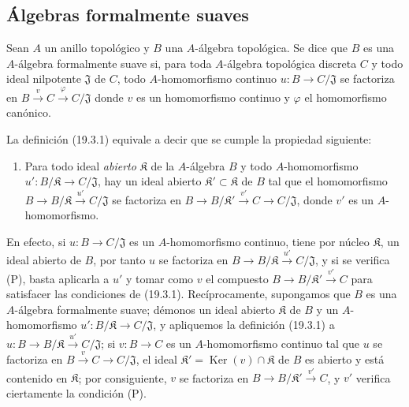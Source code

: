 \subsection{Álgebras formalmente suaves}
\label{subsection:0.19.3-fr}

\begin{definition}[19.3.1]
\label{0.19.3.1-fr}
Sean $A$ un anillo topológico y $B$ una $A$-álgebra topológica. Se dice que
$B$ es una $A$-álgebra formalmente suave si, para toda
$A$-álgebra topológica \textup{discreta} $C$
 y todo ideal \textup{nilpotente} $\mathfrak J$ de
$C$, todo $A$-homomorfismo continuo $u:B\to C/\mathfrak J$ se factoriza en
$B\xrightarrow{v}C\xrightarrow{\varphi}C/\mathfrak J$
donde $v$ es un homomorfismo continuo y $\varphi$ el homomorfismo canónico.
\end{definition}



La definición (19.3.1) equivale a decir que se cumple la propiedad siguiente:
\begin{enumerate}
  \item[(P)] Para todo ideal \emph{abierto} $\mathfrak K$ de la $A$-álgebra $B$ y
  todo $A$-homomorfismo $u':B/\mathfrak K\to C/\mathfrak J$, hay un
  ideal abierto $\mathfrak K'\subset\mathfrak K$ de $B$ tal que
  el homomorfismo
  $B\to B/\mathfrak K\xrightarrow{u'}C/\mathfrak J$ se factoriza en
  $B\to B/\mathfrak K'\xrightarrow{v'}C\to C/\mathfrak J$,
  donde $v'$ es un $A$-homomorfismo.
\end{enumerate}
En efecto, si $u:B\to C/\mathfrak J$ es un $A$-homomorfismo continuo, tiene
por núcleo $\mathfrak K$, un ideal abierto de $B$, por tanto $u$ se factoriza en
$B\to B/\mathfrak K\xrightarrow{u'}C/\mathfrak J$, y si se
verifica (P), basta aplicarla a $u'$ y tomar como $v$ el compuesto
$B\to B/\mathfrak K'\xrightarrow{v'}C$ para satisfacer las condiciones de
(19.3.1). Recíprocamente, supongamos que $B$ es una $A$-álgebra formalmente
suave; démonos un ideal abierto $\mathfrak K$ de $B$ y un
$A$-homomorfismo $u':B/\mathfrak K\to C/\mathfrak J$, y apliquemos la
definición (19.3.1) a
$u:B\to B/\mathfrak K\xrightarrow{u'}C/\mathfrak J$; si
$v:B\to C$ es un $A$-homomorfismo continuo tal que $u$ se factoriza en
$B\xrightarrow{v}C\to C/\mathfrak J$, el ideal
$\mathfrak K'=\operatorname{Ker}(v)\cap\mathfrak K$ de $B$ es abierto y
está contenido en $\mathfrak K$; por consiguiente, $v$ se factoriza en
$B\to B/\mathfrak K'\xrightarrow{v'}C$, y $v'$ verifica ciertamente la condición
(P).

